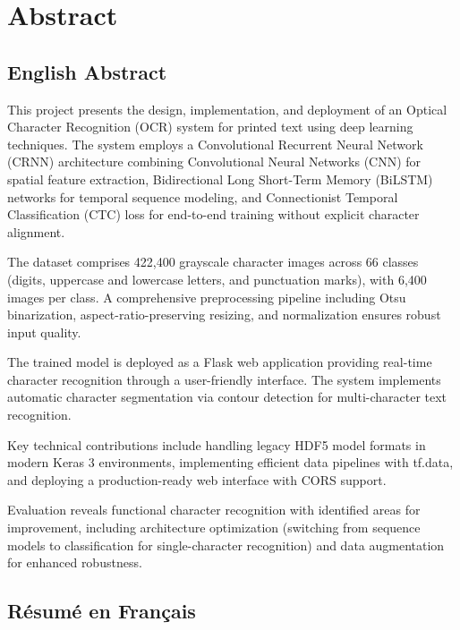 \chapter*{Abstract}
\thispagestyle{empty}

\section*{English Abstract}

This project presents the design, implementation, and deployment of an Optical Character
Recognition (OCR) system for printed text using deep learning techniques. The system
employs a Convolutional Recurrent Neural Network (CRNN) architecture combining
Convolutional Neural Networks (CNN) for spatial feature extraction, Bidirectional
Long Short-Term Memory (BiLSTM) networks for temporal sequence modeling, and
Connectionist Temporal Classification (CTC) loss for end-to-end training without
explicit character alignment.

The dataset comprises 422,400 grayscale character images across 66 classes (digits,
uppercase and lowercase letters, and punctuation marks), with 6,400 images per class.
A comprehensive preprocessing pipeline including Otsu binarization, aspect-ratio-preserving
resizing, and normalization ensures robust input quality.

The trained model is deployed as a Flask web application providing real-time character
recognition through a user-friendly interface. The system implements automatic character
segmentation via contour detection for multi-character text recognition.

Key technical contributions include handling legacy HDF5 model formats in modern Keras 3
environments, implementing efficient data pipelines with tf.data, and deploying a
production-ready web interface with CORS support.

Evaluation reveals functional character recognition with identified areas for improvement,
including architecture optimization (switching from sequence models to classification
for single-character recognition) and data augmentation for enhanced robustness.


\vspace{2cm}

\section*{Résumé en Français}

